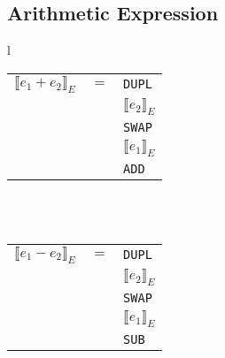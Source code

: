 \documentclass[12pt]{article}
\begin{document}
\subsection*{Arithmetic Expression}

\begin{tabular}{l}

\begin{tabular}{ccl}
    $\llbracket e_1 + e_2 \rrbracket_{E}$ & $=$ & \texttt{DUPL}\\
    & & $\llbracket e_2 \rrbracket_{E}$\\
    & & \texttt{SWAP}\\
    & & $\llbracket e_1 \rrbracket_{E}$\\
    & & \texttt{ADD}\\
\end{tabular}\\
\\            
\begin{tabular}{ccl}
    $\llbracket e_1 - e_2 \rrbracket_{E}$ & $=$ & \texttt{DUPL}\\
    & & $\llbracket e_2 \rrbracket_{E}$\\
    & & \texttt{SWAP}\\
    & & $\llbracket e_1 \rrbracket_{E}$\\
    & & \texttt{SUB}\\
\end{tabular}
\end{tabular}
\end{document}
